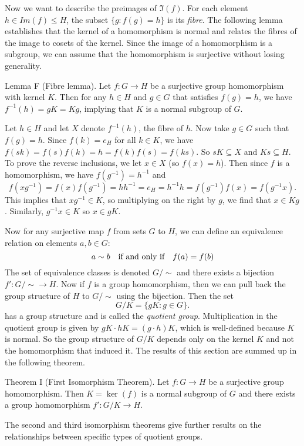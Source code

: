 Now we want to describe the preimages of $\Im(f)$. For each element $h\in Im(f)\leq H$, the subset $\{g : f(g) = h\}$ is its {\it fibre}. The following lemma establishes that the kernel of a homomorphism is normal and relates the fibres of the image to cosets of the kernel. Since the image of a homomorphism is a subgroup, we can assume that the homomorphism is surjective without losing generality.

\parenproclaim Lemma F (Fibre lemma). Let $f:G\rightarrow H$ be a surjective group homomorphism with kernel $K$. Then for any $h\in H$ and $g\in G$ that satisfies $f(g) = h$, we have $f^{-1}(h) = gK = Kg$, implying that $K$ is a normal subgroup of $G$.

\proof Let $h\in H$ and let $X$ denote $f^{-1}(h)$, the fibre of $h$. Now take $g\in G$ such that $f(g) = h$. Since $f(k) = e_H$ for all $k\in K$, we have $f(sk) = f(s)f(k) = h = f(k)f(s) = f(ks)$. So $sK\subseteq X$ and $Ks\subseteq H$. To prove the reverse inclusions, we let $x\in X$ (so $f(x) = h$). Then since $f$ is a homomorphism, we have $f(g^{-1}) = h^{-1}$ and
$$f(xg^{-1}) = f(x)f(g^{-1}) = hh^{-1} = e_H = h^{-1}h = f(g^{-1})f(x) = f(g^{-1}x).$$
This implies that $xg^{-1}\in K$, so multiplying on the right by $g$, we find that $x\in Kg$. Similarly, $g^{-1}x\in K$ so $x\in gK$.\slug

Now for any surjective map $f$ from sets $G$ to $H$, we can define an equivalence relation on elements $a,b\in G$:
$$a\sim b\quad \hbox{if and only if}\quad f(a) = f(b)$$
The set of equivalence classes is denoted $G/{\sim}$ and there exists a bijection $f':G/{\sim} \rightarrow H$. Now if $f$ is a group homomorphism, then we can pull back the group structure of $H$ to $G/{\sim}$ using the bijection. Then the set
$$G/K = \{gK : g\in G\}.$$
has a group structure and is called the {\it quotient group}. Multiplication in the quotient group is given by $gK\cdot hK = (g\cdot h) K$, which is well-defined because $K$ is normal. So the group structure of $G/K$ depends only on the kernel $K$ and not the homomorphism that induced it. The results of this section are summed up in the following theorem.

\parenproclaim Theorem I (First Isomorphism Theorem). Let $f:G\rightarrow H$ be a surjective group homomorphism. Then $K = \ker(f)$ is a normal subgroup of $G$ and there exists a group homomorphism $f':G/K \rightarrow H$.\slug

The second and third isomorphism theorems give further results on the relationships between specific types of quotient groups.

